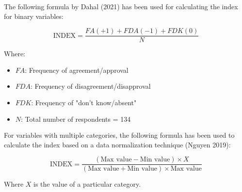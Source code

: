 The following formula by Dahal (2021) has been used for calculating the index for binary variables:

\[
\text{INDEX} = \frac{FA(+1) + FDA(-1) + FDK(0)}{N}
\]

Where:
\begin{itemize}
    \item $FA$: Frequency of agreement/approval
    \item $FDA$: Frequency of disagreement/disapproval
    \item $FDK$: Frequency of "don’t know/absent"
    \item $N$: Total number of respondents = 134
\end{itemize}

For variables with multiple categories, the following formula has been used to calculate the index based on a data normalization technique (Nguyen 2019):

\[
\text{INDEX} = \frac{(\text{Max value} - \text{Min value}) \times X}{(\text{Max value} + \text{Min value}) \times \text{Max value}}
\]

Where $X$ is the value of a particular category.